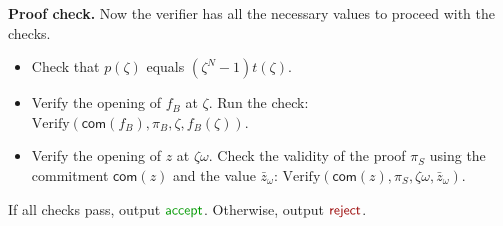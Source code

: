 \documentclass[../lecture-notes.tex]{subfiles}
\begin{document}
\textcolor{blue!60!black}{\textbf{Proof check.}} Now the verifier has all the
necessary values to proceed with the checks.
\begin{itemize}
    \item Check that $p(\zeta)$ equals $(\zeta^N - 1)t(\zeta)$.
    \item Verify the opening of $f_{B}$ at $\zeta$. 
    Run the check: $
            \text{Verify}(\mathsf{com}(f_{B}), \pi_{B}, \zeta, f_{B}(\zeta))
            $.
    \item Verify the opening of $z$ at $\zeta\omega$. 
    Check the
    validity of the proof $\pi_{S}$ using the commitment $\mathsf{com}(z)$ and the
    value $\bar{z}_{\omega}$: $
            \text{Verify}(\mathsf{com}(z), \pi_{S}, \zeta\omega, \bar{z}_{\omega})
            $.
\end{itemize}

If all checks pass, output $\textcolor{green!60!black}{\mathsf{accept}}$.
Otherwise, output $\textcolor{red!60!black}{\mathsf{reject}}$.
\end{document}
